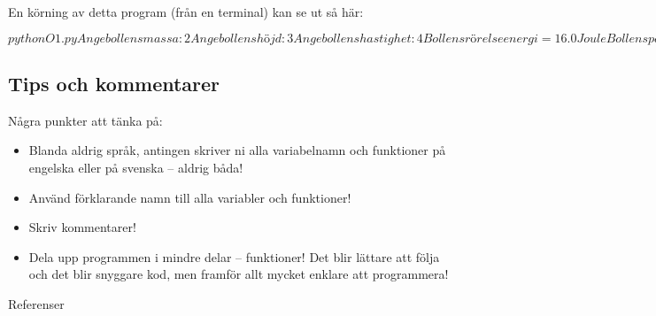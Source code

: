 \documentclass{beamer}
\begin{document}
\begin{frame}[fragile]{\insertsubsectionhead}
  En körning av detta program (från en terminal) kan se ut så här:
  \begin{terminal}
  $ python O1.py
  Ange bollens massa: 2
  Ange bollens höjd: 3
  Ange bollens hastighet: 4
  Bollens rörelseenergi =  16.0 Joule
  Bollens potentiella energi 58.92 Joule
  $

  \end{terminal}
\end{frame}


\subsection{Tips och kommentarer}

\begin{frame}{\insertsubsectionhead}
  Några punkter att tänka på:
  \begin{itemize}
    \item Blanda aldrig språk, antingen skriver ni alla variabelnamn och
    funktioner på engelska eller på svenska -- aldrig båda!
    \item Använd förklarande namn till alla variabler och funktioner!
    \item Skriv kommentarer!
    \item Dela upp programmen i mindre delar -- funktioner! Det blir
    lättare att följa och det blir snyggare kod, men framför allt mycket
    enklare att programmera!
  \end{itemize}
\end{frame}




\begin{frame}{Referenser}
  
\end{frame}
\end{document}
